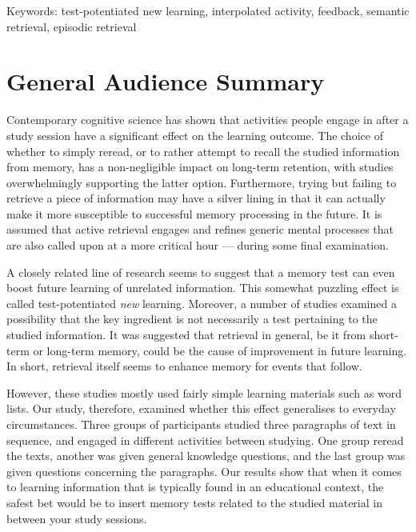 \documentclass[12pt]{article}
\begin{document}
\bigskip

\noindent Keywords: test-potentiated new learning, interpolated activity, 
feedback, semantic retrieval, episodic retrieval

\clearpage

\section{General Audience Summary}

Contemporary cognitive science has shown that activities people engage in 
after a study session have a significant effect on the learning outcome. The 
choice of whether to simply reread, or to rather attempt to recall the 
studied information from memory, has a non-negligible impact on long-term 
retention, with studies overwhelmingly supporting the latter option. 
Furthermore, trying but failing to retrieve a piece of information may have 
a silver lining in that it can actually make it more susceptible to 
successful memory processing in the future. It is assumed that active 
retrieval engages and refines generic mental processes that are also called 
upon at a more critical hour --- during some final examination. 

A closely related line of research seems to suggest that a memory test can 
even boost future learning of unrelated information. This somewhat puzzling 
effect is called test-potentiated \textit{new} learning. Moreover, a number 
of studies examined a possibility that the key ingredient is not necessarily 
a test pertaining to the studied information. It was suggested that 
retrieval in general, be it from short-term or long-term memory, could be 
the cause of improvement in future learning. In short, retrieval itself 
seems to enhance memory for events that follow. 

However, these studies mostly used fairly simple learning materials such as 
word lists. Our study, therefore, examined whether this effect generalises 
to everyday circumstances. Three groups of participants studied three 
paragraphs of text in sequence, and engaged in different activities between 
studying. One group reread the texts, another was given general knowledge 
questions, and the last group was given questions concerning the paragraphs. 
Our results show that when it comes to learning information that is 
typically found in an educational context, the safest bet would be to insert 
memory tests related to the studied material in between your study sessions.
\end{document}
